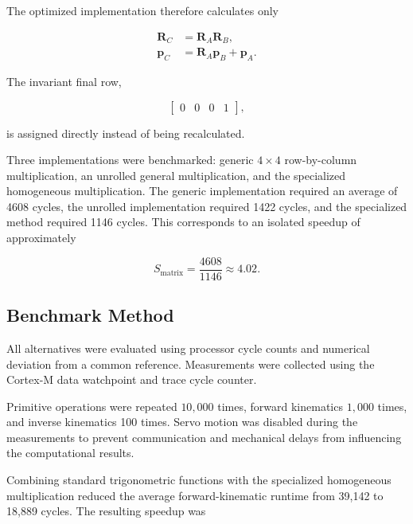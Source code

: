 The optimized implementation therefore calculates only

\begin{align}
    \mathbf{R}_{C} &=
    \mathbf{R}_{A}\mathbf{R}_{B},
    \label{eq:optimized_rotation}
    \\
    \mathbf{p}_{C} &=
    \mathbf{R}_{A}\mathbf{p}_{B}
    +
    \mathbf{p}_{A}.
    \label{eq:optimized_translation}
\end{align}

The invariant final row,

\begin{equation}
    \begin{bmatrix}
        0 & 0 & 0 & 1
    \end{bmatrix},
    \label{eq:invariant_homogeneous_row}
\end{equation}

is assigned directly instead of being recalculated.

Three implementations were benchmarked: generic \(4 \times 4\) row-by-column multiplication, an unrolled general multiplication, and the specialized homogeneous multiplication. The generic implementation required an average of 4608 cycles, the unrolled implementation required 1422 cycles, and the specialized method required 1146 cycles. This corresponds to an isolated speedup of approximately

\begin{equation}
    S_{\mathrm{matrix}}
    =
    \frac{4608}{1146}
    \approx
    4.02.
    \label{eq:matrix_speedup}
\end{equation}

\subsection{Benchmark Method}

All alternatives were evaluated using processor cycle counts and numerical deviation from a common reference. Measurements were collected using the Cortex-M data watchpoint and trace cycle counter.

Primitive operations were repeated \(10{,}000\) times, forward kinematics \(1{,}000\) times, and inverse kinematics 100 times. Servo motion was disabled during the measurements to prevent communication and mechanical delays from influencing the computational results.

Combining standard trigonometric functions with the specialized homogeneous multiplication reduced the average forward-kinematic runtime from 39,142 to 18,889 cycles. The resulting speedup was

